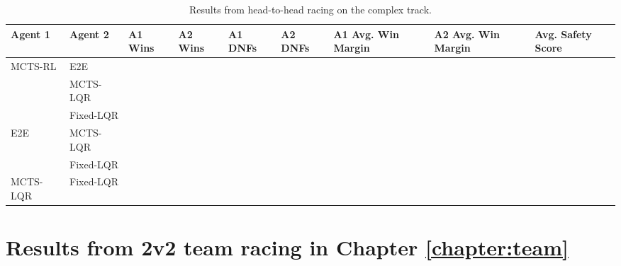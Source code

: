 \begin{table} [H]
\centering
\begin{tabular}{@{}lllllllll@{}} 
\toprule
Agent 1  & Agent 2  & A1 Wins & A2 Wins & A1 DNFs & A2 DNFs & A1 Avg. Win Margin & A2 Avg. Win Margin & Avg. Safety Score \\ \midrule
MCTS-RL  & E2E       &         &         &         &         &                  &   &               \\
         & MCTS-LQR  &         &         &         &         &                  &   &               \\
         & Fixed-LQR &         &         &         &         &                  &   &               \\
E2E      & MCTS-LQR  &         &         &         &         &                  &    &              \\
         & Fixed-LQR &         &         &         &         &                  &    &              \\
MCTS-LQR & Fixed-LQR &         &         &         &         &                  &   &               \\ \bottomrule

\end{tabular}
\vspace{1 mm}
\caption{Results from head-to-head racing on the complex track.}
 \label{tab:results_complex}
\end{table}

\section{Results from 2v2 team racing in Chapter \ref{chapter:team}}